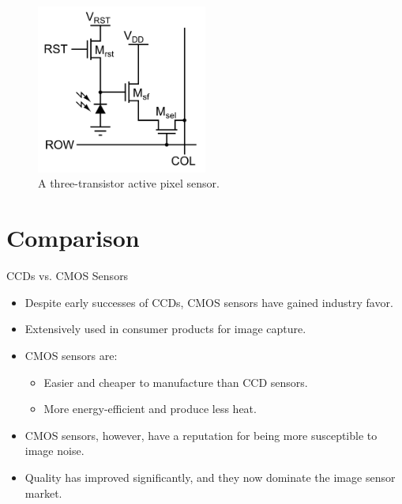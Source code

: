 \documentclass{loyola-beamer}
\begin{document}
\begin{frame}
	\begin{figure}
		\begin{center}
			\includegraphics[width=0.5\textwidth]{./figures/cmos_pixel.png}
		\end{center}
		\caption{A three-transistor active pixel sensor.}
	\end{figure}
\end{frame}

\section{Comparison}
\begin{frame}{CCDs vs. CMOS Sensors}
	\begin{itemize}
		\item Despite early successes of CCDs, CMOS sensors have gained industry favor.
		\item Extensively used in consumer products for image capture.
		\item CMOS sensors are:
		      \begin{itemize}
			      \item Easier and cheaper to manufacture than CCD sensors.
			      \item More energy-efficient and produce less heat.
		      \end{itemize}
		\item CMOS sensors, however, have a reputation for being more susceptible to image noise.
		\item Quality has improved significantly, and they now dominate the image sensor market.
	\end{itemize}
\end{frame}
\end{document}
